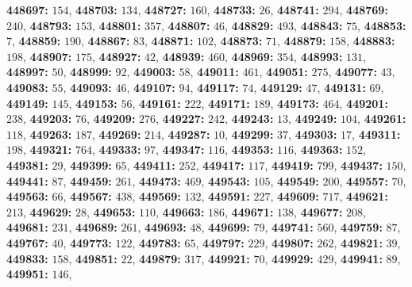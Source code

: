 \textsf{\bfseries 448697:} $154$, \textsf{\bfseries 448703:} $134$, \textsf{\bfseries 448727:} $160$, \textsf{\bfseries 448733:} $26$, \textsf{\bfseries 448741:} $294$, \textsf{\bfseries 448769:} $240$, \textsf{\bfseries 448793:} $153$, \textsf{\bfseries 448801:} $357$, \textsf{\bfseries 448807:} $46$, \textsf{\bfseries 448829:} $493$, \textsf{\bfseries 448843:} $75$, \textsf{\bfseries 448853:} $7$, \textsf{\bfseries 448859:} $190$, \textsf{\bfseries 448867:} $83$, \textsf{\bfseries 448871:} $102$, \textsf{\bfseries 448873:} $71$, \textsf{\bfseries 448879:} $158$, \textsf{\bfseries 448883:} $198$, \textsf{\bfseries 448907:} $175$, \textsf{\bfseries 448927:} $42$, \textsf{\bfseries 448939:} $460$, \textsf{\bfseries 448969:} $354$, \textsf{\bfseries 448993:} $131$, \textsf{\bfseries 448997:} $50$, \textsf{\bfseries 448999:} $92$, \textsf{\bfseries 449003:} $58$, \textsf{\bfseries 449011:} $461$, \textsf{\bfseries 449051:} $275$, \textsf{\bfseries 449077:} $43$, \textsf{\bfseries 449083:} $55$, \textsf{\bfseries 449093:} $46$, \textsf{\bfseries 449107:} $94$, \textsf{\bfseries 449117:} $74$, \textsf{\bfseries 449129:} $47$, \textsf{\bfseries 449131:} $69$, \textsf{\bfseries 449149:} $145$, \textsf{\bfseries 449153:} $56$, \textsf{\bfseries 449161:} $222$, \textsf{\bfseries 449171:} $189$, \textsf{\bfseries 449173:} $464$, \textsf{\bfseries 449201:} $238$, \textsf{\bfseries 449203:} $76$, \textsf{\bfseries 449209:} $276$, \textsf{\bfseries 449227:} $242$, \textsf{\bfseries 449243:} $13$, \textsf{\bfseries 449249:} $104$, \textsf{\bfseries 449261:} $118$, \textsf{\bfseries 449263:} $187$, \textsf{\bfseries 449269:} $214$, \textsf{\bfseries 449287:} $10$, \textsf{\bfseries 449299:} $37$, \textsf{\bfseries 449303:} $17$, \textsf{\bfseries 449311:} $198$, \textsf{\bfseries 449321:} $764$, \textsf{\bfseries 449333:} $97$, \textsf{\bfseries 449347:} $116$, \textsf{\bfseries 449353:} $116$, \textsf{\bfseries 449363:} $152$, \textsf{\bfseries 449381:} $29$, \textsf{\bfseries 449399:} $65$, \textsf{\bfseries 449411:} $252$, \textsf{\bfseries 449417:} $117$, \textsf{\bfseries 449419:} $799$, \textsf{\bfseries 449437:} $150$, \textsf{\bfseries 449441:} $87$, \textsf{\bfseries 449459:} $261$, \textsf{\bfseries 449473:} $469$, \textsf{\bfseries 449543:} $105$, \textsf{\bfseries 449549:} $200$, \textsf{\bfseries 449557:} $70$, \textsf{\bfseries 449563:} $66$, \textsf{\bfseries 449567:} $438$, \textsf{\bfseries 449569:} $132$, \textsf{\bfseries 449591:} $227$, \textsf{\bfseries 449609:} $717$, \textsf{\bfseries 449621:} $213$, \textsf{\bfseries 449629:} $28$, \textsf{\bfseries 449653:} $110$, \textsf{\bfseries 449663:} $186$, \textsf{\bfseries 449671:} $138$, \textsf{\bfseries 449677:} $208$, \textsf{\bfseries 449681:} $231$, \textsf{\bfseries 449689:} $261$, \textsf{\bfseries 449693:} $48$, \textsf{\bfseries 449699:} $79$, \textsf{\bfseries 449741:} $560$, \textsf{\bfseries 449759:} $87$, \textsf{\bfseries 449767:} $40$, \textsf{\bfseries 449773:} $122$, \textsf{\bfseries 449783:} $65$, \textsf{\bfseries 449797:} $229$, \textsf{\bfseries 449807:} $262$, \textsf{\bfseries 449821:} $39$, \textsf{\bfseries 449833:} $158$, \textsf{\bfseries 449851:} $22$, \textsf{\bfseries 449879:} $317$, \textsf{\bfseries 449921:} $70$, \textsf{\bfseries 449929:} $429$, \textsf{\bfseries 449941:} $89$, \textsf{\bfseries 449951:} $146$, 
